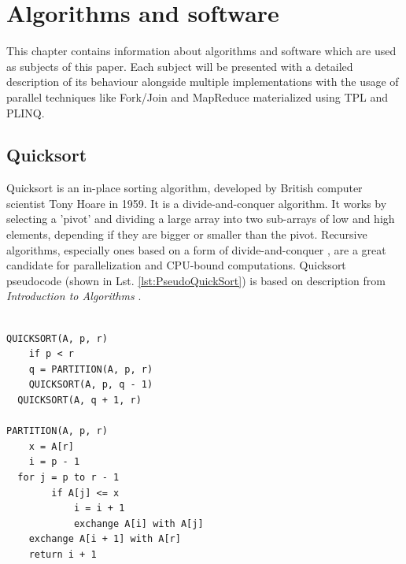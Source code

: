 \chapter{Algorithms and software}
This chapter contains information about algorithms and software which are used as subjects of this paper. Each subject will be presented with a detailed description of its behaviour alongside multiple implementations with the usage of parallel techniques like Fork/Join and MapReduce materialized using TPL and PLINQ.

\section{Quicksort}
\label{sec: QuickSortImp}
Quicksort is an in-place sorting algorithm, developed by British computer scientist Tony Hoare in 1959. It is a divide-and-conquer algorithm. It works by selecting a 'pivot' and dividing a large array into two sub-arrays of low and high elements, depending if they are bigger or smaller than the pivot. Recursive algorithms, especially ones based on a form of divide-and-conquer , are a great candidate for parallelization and CPU-bound computations. Quicksort pseudocode (shown in Lst. \ref{lst:PseudoQuickSort}) is based on description from \emph{Introduction to Algorithms} \cite{Cormen2009}.

\begin{lstlisting}[basicstyle=\ttfamily\small, caption={Sequential Quicksort pseudocode}, label={lst:PseudoQuickSort}]

QUICKSORT(A, p, r)
	if p < r
	q = PARTITION(A, p, r)
	QUICKSORT(A, p, q - 1)
  QUICKSORT(A, q + 1, r)
	
PARTITION(A, p, r)
	x = A[r]
	i = p - 1
  for j = p to r - 1
		if A[j] <= x
			i = i + 1
			exchange A[i] with A[j]
	exchange A[i + 1] with A[r]
	return i + 1
\end{lstlisting}

